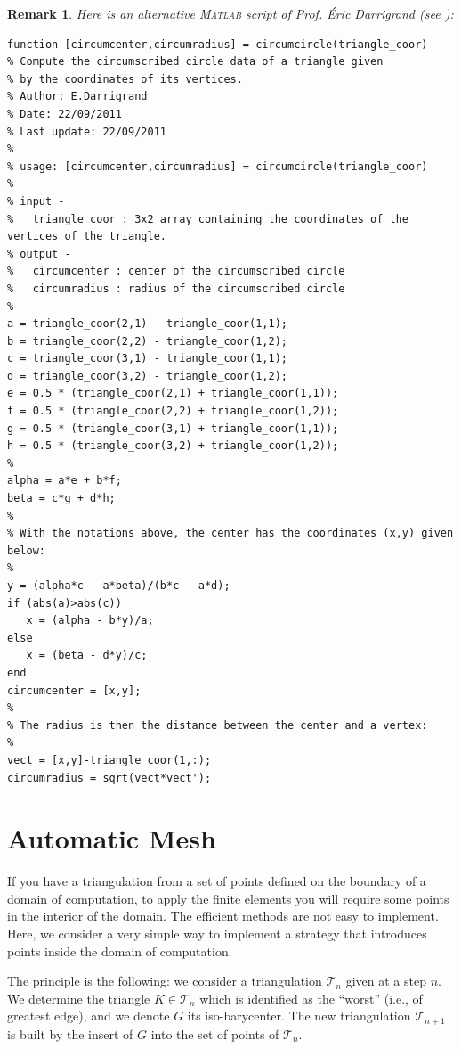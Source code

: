 \documentclass[11pt,a4paper,center,notitlepage]{article}
\numberwithin{equation}{section}
\newtheorem{remark}{Remark}[section]
\begin{document}
\begin{remark}
Here is an alternative \textsc{Matlab} script of Prof. \'Eric Darrigrand (see \emph{\cite{1}}):
\begin{verbatim}
function [circumcenter,circumradius] = circumcircle(triangle_coor)
% Compute the circumscribed circle data of a triangle given 
% by the coordinates of its vertices.
% Author: E.Darrigrand
% Date: 22/09/2011
% Last update: 22/09/2011
%
% usage: [circumcenter,circumradius] = circumcircle(triangle_coor)
%
% input -
%   triangle_coor : 3x2 array containing the coordinates of the vertices of the triangle.  
% output - 
%   circumcenter : center of the circumscribed circle
%   circumradius : radius of the circumscribed circle
%
a = triangle_coor(2,1) - triangle_coor(1,1);
b = triangle_coor(2,2) - triangle_coor(1,2);
c = triangle_coor(3,1) - triangle_coor(1,1);
d = triangle_coor(3,2) - triangle_coor(1,2);
e = 0.5 * (triangle_coor(2,1) + triangle_coor(1,1));
f = 0.5 * (triangle_coor(2,2) + triangle_coor(1,2));
g = 0.5 * (triangle_coor(3,1) + triangle_coor(1,1));
h = 0.5 * (triangle_coor(3,2) + triangle_coor(1,2));
%
alpha = a*e + b*f;
beta = c*g + d*h;
%
% With the notations above, the center has the coordinates (x,y) given below:
%
y = (alpha*c - a*beta)/(b*c - a*d);
if (abs(a)>abs(c))
   x = (alpha - b*y)/a;
else
   x = (beta - d*y)/c;
end
circumcenter = [x,y];
% 
% The radius is then the distance between the center and a vertex:
%
vect = [x,y]-triangle_coor(1,:);
circumradius = sqrt(vect*vect');
\end{verbatim}
\end{remark}

\section{Automatic Mesh}
If you have a triangulation from a set of points defined on the boundary of a domain of computation, to apply the finite elements you will require some points in the interior of the domain. The efficient methods are not easy to implement. Here, we consider a very simple way to implement a strategy that introduces points inside the domain of computation.

The principle is the following: we consider a triangulation $\mathcal{T}_n$ given at a step $n$. We determine the triangle $K\in \mathcal{T}_n$ which is identified as the ``worst'' (i.e., of greatest edge), and we denote $G$ its iso-barycenter. The new triangulation $\mathcal{T}_{n+1}$ is built by the insert of $G$ into the set of points of $\mathcal{T}_n$.
\end{document}
